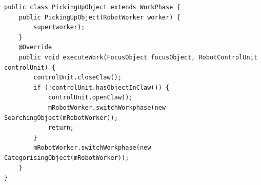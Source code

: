 \begin{lstlisting}[caption={Implementierung der Arbeitsphase \glqq Gegenstand aufnehmen\grqq }, label=lst:Pickup]
public class PickingUpObject extends WorkPhase {
    public PickingUpObject(RobotWorker worker) {
        super(worker);
    }
    @Override
    public void executeWork(FocusObject focusObject, RobotControlUnit controlUnit) {
        controlUnit.closeClaw();
        if (!controlUnit.hasObjectInClaw()) {
            controlUnit.openClaw();
            mRobotWorker.switchWorkphase(new SearchingObject(mRobotWorker));
            return;
        }
        mRobotWorker.switchWorkphase(new CategorisingObject(mRobotWorker));
    }
}
\end{lstlisting}

